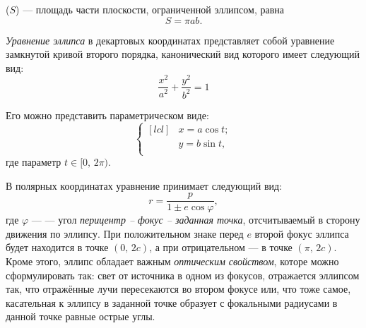  ($S$) --- площадь части 
плоскости, ограниченной эллипсом, равна
\begin{equation}
S=\pi ab.
\end{equation}


{\itshape Уравнение эллипса} в декартовых координатах 
представляет собой уравнение замкнутой кривой второго 
порядка, канонический вид которого имеет следующий вид:
\begin{equation}
\frac{x^2}{a^2}+\frac{y^2}{b^2}=1
\end{equation}

Его можно представить параметрическом виде:\begin{equation}
\left\{\begin{aligned}[lcl]
&x=a\cos t;\\
&y=b\sin t,\\
\end{aligned}
\right.
\end{equation}
где параметр $t \in [0, \, 2\pi)$.

В полярных координатах уравнение принимает следующий вид:
\begin{equation}
r=\frac{p}{1\pm e \cos \varphi},
\label{eq:ellipse-pol-eq}
\end{equation} 
где $\varphi$ ---  --- угол 
{\slshape перицентр -- фокус -- заданная точка}, 
отсчитываемый в сторону движения по эллипсу. При 
положительном знаке перед $e$ второй фокус эллипса будет 
находится в точке $(0, \, 2c)$, а при отрицательном --- в 
точке $(\pi, \, 2c)$.\\

Кроме этого, эллипс обладает важным {\itshape оптическим 
свойством}, которе можно сформулировать так: свет от источника в одном из фокусов, 
	отражается эллипсом так, что отражённые лучи пересекаются 
	во втором фокусе или, что тоже самое, касательная к эллипсу в заданной точке образует с фокальными радиусами в данной точке равные острые углы.






 
